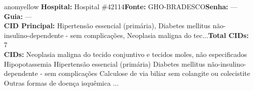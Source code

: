 \documentclass[a4paper,10pt]{article}
\begin{document}
\begin{anomalycard}[Interna\c{c}\~{a}o \#120600 | Pac. \#99967 | MODERADO (z=2.55) | LOS: 2d | 09/03/2026\,$\to$\,11/03/2026]{anomyellow}
\textbf{Hospital:} Hospital \#42114\quad \textbf{Fonte:} GHO-BRADESCO\quad \textbf{Senha:} ---\quad \textbf{Guia:} ---\\

\textbf{CID Principal:} {\small Hipertensão essencial (primária), Diabetes mellitus não-insulino-dependente - sem complicações, Neoplasia maligna do tec...}\quad\textbf{Total CIDs:} 7\\

\textbf{CIDs:} {\scriptsize Neoplasia maligna do tecido conjuntivo e tecidos moles, não especificados \textbar{} Hipopotassemia \textbar{} Hipertensão essencial (primária) \textbar{} Diabetes mellitus não-insulino-dependente - sem complicações \textbar{} Calculose de via biliar sem colangite ou colecistite \textbar{} Outras formas de doença isquêmica ...}\\



\end{anomalycard}
\end{document}
